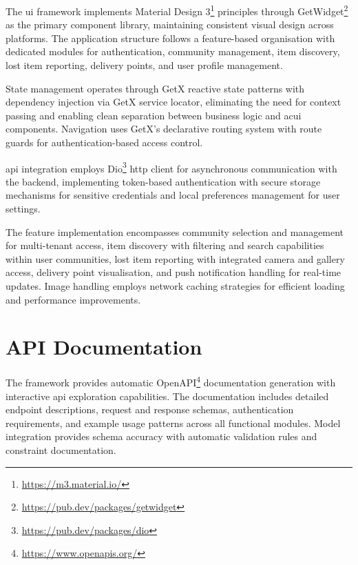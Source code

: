 The \ac{ui} framework implements Material Design 3\footnote{\url{https://m3.material.io/}} principles through GetWidget\footnote{\url{https://pub.dev/packages/getwidget}} as the primary component library, maintaining consistent visual design across platforms. The application structure follows a feature-based organisation with dedicated modules for authentication, community management, item discovery, lost item reporting, delivery points, and user profile management.

State management operates through GetX reactive state patterns with dependency injection via GetX service locator, eliminating the need for context passing and enabling clean separation between business logic and ac{ui} components. Navigation uses GetX's declarative routing system with route guards for authentication-based access control.

\ac{api} integration employs Dio\footnote{\url{https://pub.dev/packages/dio}} \ac{http} client for asynchronous communication with the backend, implementing token-based authentication with secure storage mechanisms for sensitive credentials and local preferences management for user settings.

The feature implementation encompasses community selection and management for multi-tenant access, item discovery with filtering and search capabilities within user communities, lost item reporting with integrated camera and gallery access, delivery point visualisation, and push notification handling for real-time updates. Image handling employs network caching strategies for efficient loading and performance improvements.




\section{API Documentation} \label{section:api_documentation}

The framework provides automatic OpenAPI\footnote{\url{https://www.openapis.org/}} documentation generation with interactive \ac{api} exploration capabilities. The documentation includes detailed endpoint descriptions, request and response schemas, authentication requirements, and example usage patterns across all functional modules. Model integration provides schema accuracy with automatic validation rules and constraint documentation.

